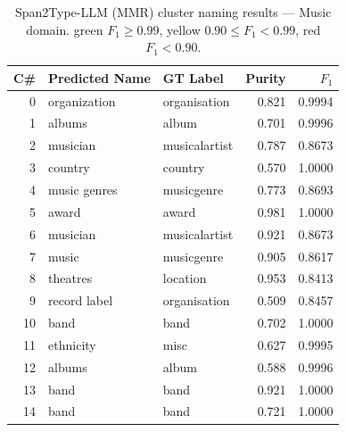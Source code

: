 \documentclass[11pt,a4paper]{article}
\begin{document}
\begin{table}[ht]
\centering
\small
\caption{Span2Type-LLM (MMR) cluster naming results --- Music domain.
\colorbox{green!15}{green} $F_1 \geq 0.99$,
\colorbox{yellow!25}{yellow} $0.90 \leq F_1 < 0.99$,
\colorbox{red!15}{red} $F_1 < 0.90$.}
\label{tab:naming_music}
\setlength{\tabcolsep}{5pt}
\begin{tabular}{r l l r r}
\toprule
\textbf{C\#} & \textbf{Predicted Name} & \textbf{GT Label} & \textbf{Purity} & \textbf{$F_1$} \\
\midrule
   0 & organization                   & organisation           & 0.821 & \cellcolor{green!15}0.9994 \\
   1 & albums                         & album                  & 0.701 & \cellcolor{green!15}0.9996 \\
   2 & musician                       & musicalartist          & 0.787 & \cellcolor{red!15}0.8673 \\
   3 & country                        & country                & 0.570 & \cellcolor{green!15}1.0000 \\
   4 & music genres                   & musicgenre             & 0.773 & \cellcolor{red!15}0.8693 \\
   5 & award                          & award                  & 0.981 & \cellcolor{green!15}1.0000 \\
   6 & musician                       & musicalartist          & 0.921 & \cellcolor{red!15}0.8673 \\
   7 & music                          & musicgenre             & 0.905 & \cellcolor{red!15}0.8617 \\
   8 & theatres                       & location               & 0.953 & \cellcolor{red!15}0.8413 \\
   9 & record label                   & organisation           & 0.509 & \cellcolor{red!15}0.8457 \\
  10 & band                           & band                   & 0.702 & \cellcolor{green!15}1.0000 \\
  11 & ethnicity                      & misc                   & 0.627 & \cellcolor{green!15}0.9995 \\
  12 & albums                         & album                  & 0.588 & \cellcolor{green!15}0.9996 \\
  13 & band                           & band                   & 0.921 & \cellcolor{green!15}1.0000 \\
  14 & band                           & band                   & 0.721 & \cellcolor{green!15}1.0000 \\

\end{tabular}
\end{table}
\end{document}
